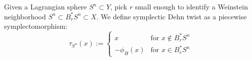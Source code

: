 

    Given a Lagrangian sphere $S^n\subset Y$, pick $r$ small enough to identify a Weinstein neighborhood  $S^n\subset B_r^*S^n\subset X$. 
    We define symplectic Dehn twist as a piecewise symplectomorphism:
    \[\tau_{S^n}(x):=\left\{\begin{array}{cc} x & \text{for $x\not\in B_r^*S^n$}\\
        -\phi_H(x) & \text{for $x\in B_r^*S^n$}
    \end{array}\right.\]
